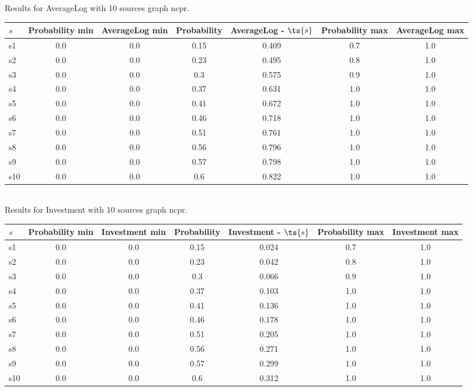 \documentclass{article}
\begin{document}
\noindent Results for AverageLog with 10 sources graph ncpr.

\noindent\begin{tabular}{|l|c|c|c|c|c|c|}
\hline
$s$& Probability min & AverageLog min & Probability & AverageLog - $\ts{s}$ & Probability max & AverageLog max\\
\hline
s1 &0.0 & 0.0 & 0.15 & 0.409 & 0.7 & 1.0\\
\hline
s2 &0.0 & 0.0 & 0.23 & 0.495 & 0.8 & 1.0\\
\hline
s3 &0.0 & 0.0 & 0.3 & 0.575 & 0.9 & 1.0\\
\hline
s4 &0.0 & 0.0 & 0.37 & 0.631 & 1.0 & 1.0\\
\hline
s5 &0.0 & 0.0 & 0.41 & 0.672 & 1.0 & 1.0\\
\hline
s6 &0.0 & 0.0 & 0.46 & 0.718 & 1.0 & 1.0\\
\hline
s7 &0.0 & 0.0 & 0.51 & 0.761 & 1.0 & 1.0\\
\hline
s8 &0.0 & 0.0 & 0.56 & 0.796 & 1.0 & 1.0\\
\hline
s9 &0.0 & 0.0 & 0.57 & 0.798 & 1.0 & 1.0\\
\hline
s10 &0.0 & 0.0 & 0.6 & 0.822 & 1.0 & 1.0\\
\hline
\end{tabular}\\

\noindent Results for Investment with 10 sources graph ncpr.

\noindent\begin{tabular}{|l|c|c|c|c|c|c|}
\hline
$s$& Probability min & Investment min & Probability & Investment - $\ts{s}$ & Probability max & Investment max\\
\hline
s1 &0.0 & 0.0 & 0.15 & 0.024 & 0.7 & 1.0\\
\hline
s2 &0.0 & 0.0 & 0.23 & 0.042 & 0.8 & 1.0\\
\hline
s3 &0.0 & 0.0 & 0.3 & 0.066 & 0.9 & 1.0\\
\hline
s4 &0.0 & 0.0 & 0.37 & 0.103 & 1.0 & 1.0\\
\hline
s5 &0.0 & 0.0 & 0.41 & 0.136 & 1.0 & 1.0\\
\hline
s6 &0.0 & 0.0 & 0.46 & 0.178 & 1.0 & 1.0\\
\hline
s7 &0.0 & 0.0 & 0.51 & 0.205 & 1.0 & 1.0\\
\hline
s8 &0.0 & 0.0 & 0.56 & 0.271 & 1.0 & 1.0\\
\hline
s9 &0.0 & 0.0 & 0.57 & 0.299 & 1.0 & 1.0\\
\hline
s10 &0.0 & 0.0 & 0.6 & 0.312 & 1.0 & 1.0\\
\hline
\end{tabular}\\
\end{document}
